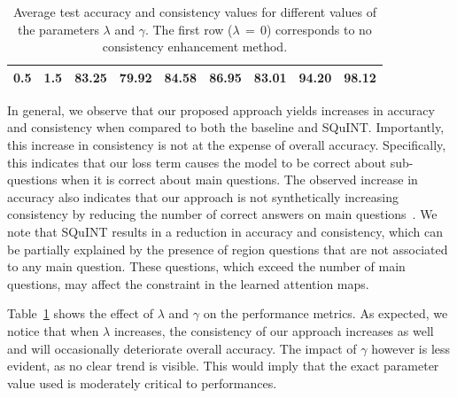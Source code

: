 \begin{table}[!t]
\begin{center}
\begin{tabular}{lllllllll}
\\ 
\multicolumn{1}{l}{0.5}                     & \multicolumn{1}{l}{1.5}             & \multicolumn{1}{l}{83.25} & \multicolumn{1}{l}{ 79.92} & \multicolumn{1}{l}{ 84.58} & \multicolumn{1}{l}{ 86.95} & \multicolumn{1}{l}{83.01} & \multicolumn{1}{l}{ 94.20} & \multicolumn{1}{l}{ 98.12} 

\\ \bottomrule                  
\end{tabular}
\endgroup
\end{center}
\caption{Average test accuracy and consistency values for different values of the parameters $\lambda$ and $\gamma$. The first row ($\lambda\, =\, 0$) corresponds to no consistency enhancement method.}
\label{tab:results_params}
\end{table}
In general, we observe that our proposed approach yields increases in accuracy and consistency when compared to both the baseline and SQuINT. Importantly, this increase in consistency is not at the expense of overall accuracy. Specifically, this indicates that our loss term causes the model to be correct about sub-questions when it is correct about main questions. The observed increase in accuracy also indicates that our approach is not synthetically increasing consistency by reducing the number of correct answers on main questions~\cite{selvaraju2020squinting}. We note that SQuINT results in a reduction in accuracy and consistency, which can be partially explained by the presence of region questions that are not associated to any main question. These questions, which exceed the number of main questions, may affect the constraint in the learned attention maps.

Table~\ref{tab:results_params} shows the effect of $\lambda$ and $\gamma$ on the performance metrics. As expected, we notice that when $\lambda$ increases, the consistency of our approach increases as well and will occasionally deteriorate overall accuracy. The impact of $\gamma$ however is less evident, as no clear trend is visible. This would imply that the exact parameter value used is moderately critical to performances. 